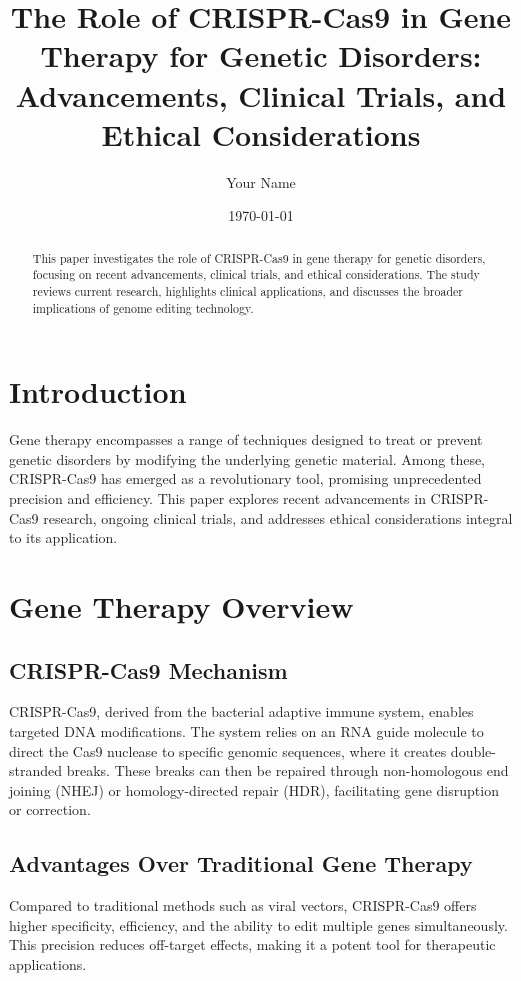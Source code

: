 \documentclass[12pt]{article}
\title{The Role of CRISPR-Cas9 in Gene Therapy for Genetic Disorders: Advancements, Clinical Trials, and Ethical Considerations}
\author{Your Name}
\date{\today}
\begin{document}
\maketitle

\begin{abstract}
This paper investigates the role of CRISPR-Cas9 in gene therapy for genetic disorders, focusing on recent advancements, clinical trials, and ethical considerations. The study reviews current research, highlights clinical applications, and discusses the broader implications of genome editing technology.
\end{abstract}

\section{Introduction}
Gene therapy encompasses a range of techniques designed to treat or prevent genetic disorders by modifying the underlying genetic material. Among these, CRISPR-Cas9 has emerged as a revolutionary tool, promising unprecedented precision and efficiency. This paper explores recent advancements in CRISPR-Cas9 research, ongoing clinical trials, and addresses ethical considerations integral to its application.

\section{Gene Therapy Overview}
\subsection{CRISPR-Cas9 Mechanism}
CRISPR-Cas9, derived from the bacterial adaptive immune system, enables targeted DNA modifications. The system relies on an RNA guide molecule to direct the Cas9 nuclease to specific genomic sequences, where it creates double-stranded breaks. These breaks can then be repaired through non-homologous end joining (NHEJ) or homology-directed repair (HDR), facilitating gene disruption or correction.

\subsection{Advantages Over Traditional Gene Therapy}
Compared to traditional methods such as viral vectors, CRISPR-Cas9 offers higher specificity, efficiency, and the ability to edit multiple genes simultaneously. This precision reduces off-target effects, making it a potent tool for therapeutic applications.
\end{document}
